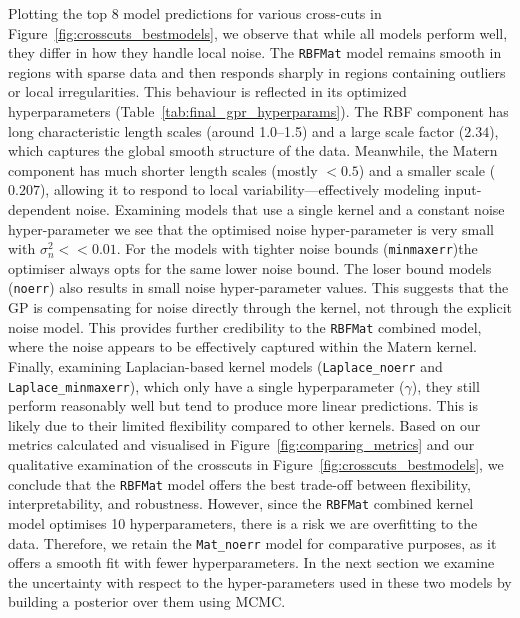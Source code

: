 \documentclass[10pt]{article}
\begin{document}
Plotting the top 8 model predictions for various cross-cuts in Figure~\ref{fig:crosscuts_bestmodels}, we observe that while all models perform well, they differ in how they handle local noise.
The \texttt{RBFMat} model remains smooth in regions with sparse data and then responds sharply in regions containing outliers or local irregularities.
This behaviour is reflected in its optimized hyperparameters (Table~\ref{tab:final_gpr_hyperparams}). The RBF component has long characteristic length scales (around 1.0--1.5) and a large scale factor ($2.34$),
which captures the global smooth structure of the data. Meanwhile, the Matern component has much shorter length scales (mostly $< 0.5$) and a smaller scale ($0.207$), allowing it to respond to local variability—effectively modeling input-dependent noise.
Examining models that use a single kernel and a constant noise hyper-parameter we see that the optimised noise hyper-parameter is very small with \(\sigma_n^2 << 0.01\). For the models with tighter noise bounds (\texttt{minmaxerr})the optimiser always opts for the same lower noise bound. The loser bound models (\texttt{noerr})
also results in small noise hyper-parameter values. This suggests that the GP is compensating for noise directly through the kernel, not through the explicit noise model. This provides further credibility to the \texttt{RBFMat} combined model, where the noise appears to be effectively captured within the Matern kernel.
Finally, examining Laplacian-based kernel models (\texttt{Laplace\_noerr} and \texttt{Laplace\_minmaxerr}), which only have a single hyperparameter ($\gamma$), they still perform reasonably well but tend to produce more linear predictions. This is likely due to their limited flexibility compared to other kernels.
Based on our metrics calculated and visualised in Figure~\ref{fig:comparing_metrics} and our qualitative examination of the crosscuts in Figure~\ref{fig:crosscuts_bestmodels}, we conclude that the \texttt{RBFMat} model offers the best trade-off between flexibility, interpretability, and robustness.
However, since the \texttt{RBFMat} combined kernel model optimises 10 hyperparameters, there is a risk we are overfitting to the data. Therefore, we retain the \texttt{Mat\_noerr} model for comparative purposes, as it offers a smooth fit with fewer hyperparameters. In the next section we examine the uncertainty with respect to the hyper-parameters used in these two models
by building a posterior over them using MCMC.
\end{document}
